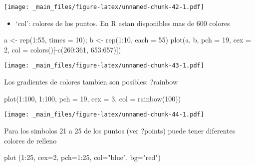 \documentclass[
]{book}
\newenvironment{Shaded}{\begin{snugshade}}{\end{snugshade}}
\newcommand{\AttributeTok}[1]{\textcolor[rgb]{0.77,0.63,0.00}{#1}}
\newcommand{\DecValTok}[1]{\textcolor[rgb]{0.00,0.00,0.81}{#1}}
\newcommand{\FunctionTok}[1]{\textcolor[rgb]{0.00,0.00,0.00}{#1}}
\newcommand{\NormalTok}[1]{#1}
\newcommand{\OtherTok}[1]{\textcolor[rgb]{0.56,0.35,0.01}{#1}}
\newcommand{\SpecialCharTok}[1]{\textcolor[rgb]{0.00,0.00,0.00}{#1}}
\newcommand{\StringTok}[1]{\textcolor[rgb]{0.31,0.60,0.02}{#1}}
\providecommand{\tightlist}{%
  \setlength{\itemsep}{0pt}\setlength{\parskip}{0pt}}
\begin{document}
\texttt{[image: \_main\_files/figure-latex/unnamed-chunk-42-1.pdf]}

\begin{itemize}
\tightlist
\item
  `col': colores de los puntos. En R estan disponibles mas de 600 colores
\end{itemize}

\begin{Shaded}
\begin{Highlighting}[]
\NormalTok{a }\OtherTok{\textless{}{-}} \FunctionTok{rep}\NormalTok{(}\DecValTok{1}\SpecialCharTok{:}\DecValTok{55}\NormalTok{, }\AttributeTok{times =} \DecValTok{10}\NormalTok{); b }\OtherTok{\textless{}{-}} \FunctionTok{rep}\NormalTok{(}\DecValTok{1}\SpecialCharTok{:}\DecValTok{10}\NormalTok{, }\AttributeTok{each =} \DecValTok{55}\NormalTok{)}
\FunctionTok{plot}\NormalTok{(a, b, }\AttributeTok{pch =} \DecValTok{19}\NormalTok{, }\AttributeTok{cex =} \DecValTok{2}\NormalTok{, }\AttributeTok{col =} \FunctionTok{colors}\NormalTok{()[}\SpecialCharTok{{-}}\FunctionTok{c}\NormalTok{(}\DecValTok{260}\SpecialCharTok{:}\DecValTok{361}\NormalTok{, }\DecValTok{653}\SpecialCharTok{:}\DecValTok{657}\NormalTok{)])}
\end{Highlighting}
\end{Shaded}

\texttt{[image: \_main\_files/figure-latex/unnamed-chunk-43-1.pdf]}

Los gradientes de colores tambien son posibles: ?rainbow

\begin{Shaded}
\begin{Highlighting}[]
\FunctionTok{plot}\NormalTok{(}\DecValTok{1}\SpecialCharTok{:}\DecValTok{100}\NormalTok{, }\DecValTok{1}\SpecialCharTok{:}\DecValTok{100}\NormalTok{, }\AttributeTok{pch =} \DecValTok{19}\NormalTok{, }\AttributeTok{cex =} \DecValTok{3}\NormalTok{, }\AttributeTok{col =} \FunctionTok{rainbow}\NormalTok{(}\DecValTok{100}\NormalTok{))}
\end{Highlighting}
\end{Shaded}

\texttt{[image: \_main\_files/figure-latex/unnamed-chunk-44-1.pdf]}

Para los simbolos 21 a 25 de los puntos (ver ?points) puede tener diferentes colores de relleno

\begin{Shaded}
\begin{Highlighting}[]
\FunctionTok{plot}\NormalTok{ (}\DecValTok{1}\SpecialCharTok{:}\DecValTok{25}\NormalTok{, }\AttributeTok{cex=}\DecValTok{2}\NormalTok{, }\AttributeTok{pch=}\DecValTok{1}\SpecialCharTok{:}\DecValTok{25}\NormalTok{, }\AttributeTok{col=}\StringTok{"blue"}\NormalTok{, }\AttributeTok{bg=}\StringTok{"red"}\NormalTok{)}
\end{Highlighting}
\end{Shaded}
\end{document}
